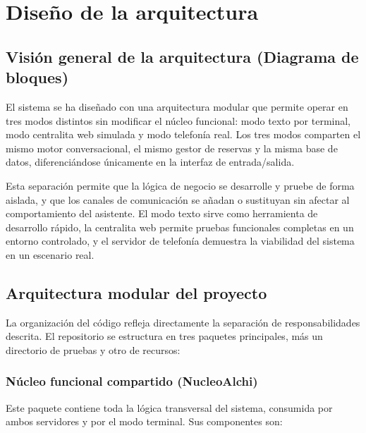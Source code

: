 \chapter{\textbf{Diseño de la arquitectura}}
\label{ch:Arquitectura}
\thispagestyle{fancy}

\section{Visión general de la arquitectura (Diagrama de bloques)}
\label{sec:vision_general_arquitectura}

El sistema se ha diseñado con una arquitectura modular que permite operar en tres modos distintos sin modificar el núcleo funcional: modo texto por terminal, modo centralita web simulada y modo telefonía real. Los tres modos comparten el mismo motor conversacional, el mismo gestor de reservas y la misma base de datos, diferenciándose únicamente en la interfaz de entrada/salida.


Esta separación permite que la lógica de negocio se desarrolle y pruebe de forma aislada, y que los canales de comunicación se añadan o sustituyan sin afectar al comportamiento del asistente. El modo texto sirve como herramienta de desarrollo rápido, la centralita web permite pruebas funcionales completas en un entorno controlado, y el servidor de telefonía demuestra la viabilidad del sistema en un escenario real.

\section{Arquitectura modular del proyecto}
\label{sec:arquitectura_modular}

La organización del código refleja directamente la separación de responsabilidades descrita. El repositorio se estructura en tres paquetes principales, más un directorio de pruebas y otro de recursos:

\subsection{Núcleo funcional compartido (NucleoAlchi)}
\label{subsec:nucleo_alchi}

Este paquete contiene toda la lógica transversal del sistema, consumida por ambos servidores y por el modo terminal. Sus componentes son:

